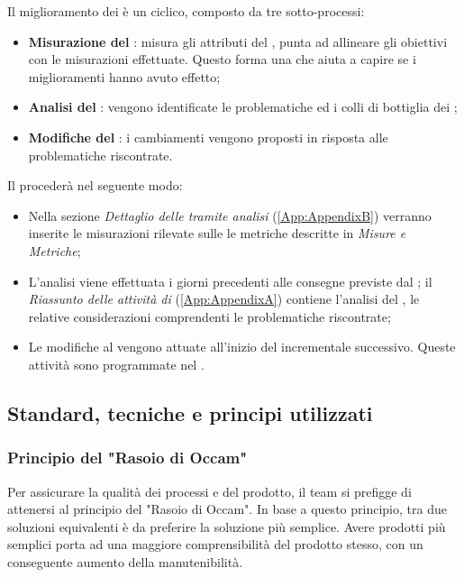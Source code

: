 Il miglioramento dei  è un  ciclico, composto da tre sotto-processi:
\begin{itemize}
\item \textbf{Misurazione del }: misura gli attributi del , punta ad allineare gli obiettivi con le misurazioni effettuate. Questo forma una  che aiuta a capire se i miglioramenti hanno avuto effetto;
\item \textbf{Analisi del }: vengono identificate le problematiche ed i colli di bottiglia dei ;
\item \textbf{Modifiche del }: i cambiamenti vengono proposti in risposta alle problematiche riscontrate.
\end{itemize}
Il  procederà nel seguente modo: 
\begin{itemize}
\item Nella sezione \textit{Dettaglio delle  tramite analisi} (\ref{App:AppendixB})  verranno inserite le misurazioni rilevate sulle le metriche descritte in \textit{Misure e Metriche};
\item L'analisi viene effettuata i giorni precedenti alle consegne previste dal ; il \textit{Riassunto delle attività di } (\ref{App:AppendixA}) contiene l'analisi del , le relative considerazioni  comprendenti le problematiche riscontrate;
\item Le modifiche al  vengono attuate all'inizio del  incrementale successivo. Queste attività sono programmate nel \PianoDiProgetto.
\end{itemize}

\subsection{Standard, tecniche e principi utilizzati}
\subsubsection{Principio del "Rasoio di Occam"}
Per assicurare la qualità dei processi e del prodotto, il team si prefigge di attenersi al principio del "Rasoio di Occam". In base a questo principio, tra due soluzioni equivalenti è da preferire la soluzione più semplice. Avere prodotti più semplici porta ad una maggiore comprensibilità del prodotto stesso, con un conseguente aumento della manutenibilità.
